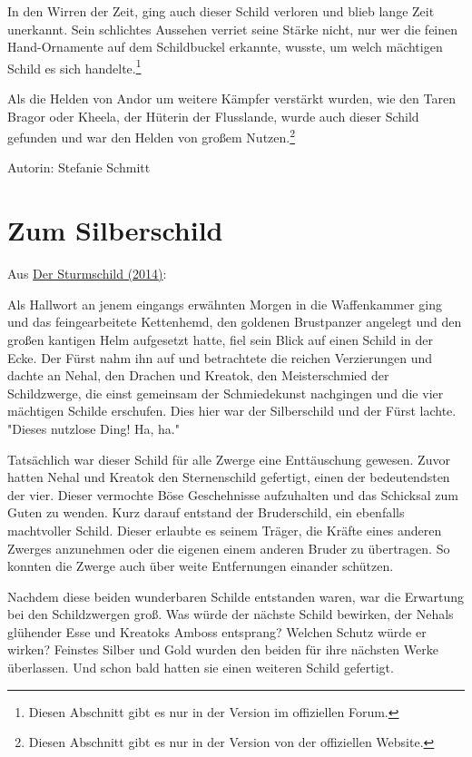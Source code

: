 \documentclass[10pt, a4paper, oneside]{book}
\newcommand{\fillbreak}{\vspace*{\fill}\columnbreak}
\newcommand{\storytext}[1]{%
    \section{#1}%
    \label{Storytext: #1}%
}
\newcommand{\refstorytext}[1]{\hyperref[Storytext: #1]{#1}}
\begin{document}
\begin{multicols}{2}
In den Wirren der Zeit, ging auch dieser Schild verloren und blieb lange Zeit unerkannt. Sein schlichtes Aussehen verriet seine Stärke nicht, nur wer die feinen Hand-Ornamente auf dem Schildbuckel erkannte, wusste, um welch mächtigen Schild es sich handelte.\footnote{Diesen Abschnitt gibt es nur in der Version im offiziellen Forum.}

Als die Helden von Andor um weitere Kämpfer verstärkt wurden, wie den Taren Bragor oder Kheela, der Hüterin der Flusslande, wurde auch dieser Schild gefunden und war den Helden von großem Nutzen.\footnote{Diesen Abschnitt gibt es nur in der Version von der offiziellen Website.}\bigskip

Autorin: Stefanie Schmitt



\fillbreak
\storytext{Zum Silberschild}

\begin{center}
    Aus \refstorytext{Der Sturmschild (2014)}:
\end{center}

Als Hallwort an jenem eingangs erwähnten Morgen in die Waffenkammer ging und das feingearbeitete Kettenhemd, den goldenen Brustpanzer angelegt und den großen kantigen Helm aufgesetzt hatte, fiel sein Blick auf einen Schild in der Ecke. Der Fürst nahm ihn auf und betrachtete die reichen Verzierungen und dachte an Nehal, den Drachen und Kreatok, den Meisterschmied der Schildzwerge, die einst gemeinsam der Schmiedekunst nachgingen und die vier mächtigen Schilde erschufen. Dies hier war der Silberschild und der Fürst lachte. "Dieses nutzlose Ding! Ha, ha."\bigskip

Tatsächlich war dieser Schild für alle Zwerge eine Enttäuschung gewesen. Zuvor hatten Nehal und Kreatok den Sternenschild gefertigt, einen der  bedeutendsten der vier. Dieser vermochte Böse Geschehnisse aufzuhalten  und das Schicksal zum Guten zu wenden. Kurz darauf entstand der Bruderschild, ein ebenfalls machtvoller Schild.  Dieser erlaubte es seinem Träger, die Kräfte eines anderen Zwerges anzunehmen oder die eigenen einem anderen Bruder zu übertragen. So konnten die Zwerge auch über weite Entfernungen einander schützen.\bigskip

Nachdem diese beiden wunderbaren Schilde entstanden waren, war die Erwartung bei den Schildzwergen groß. Was würde der nächste Schild bewirken, der Nehals glühender Esse und Kreatoks Amboss entsprang? Welchen Schutz würde er wirken? Feinstes Silber und Gold wurden den beiden für ihre nächsten Werke überlassen. Und schon bald hatten sie einen weiteren Schild gefertigt.


\end{multicols}
\end{document}
